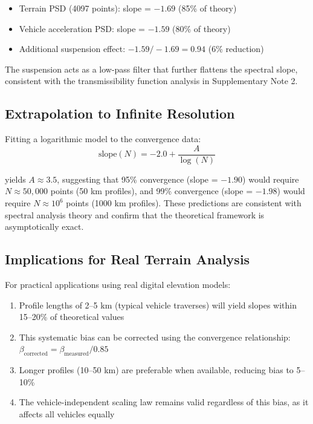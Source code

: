 \documentclass[11pt,letterpaper]{article}
\begin{document}
\begin{itemize}
\item Terrain PSD (4097 points): slope = $-1.69$ (85\% of theory)
\item Vehicle acceleration PSD: slope = $-1.59$ (80\% of theory)
\item Additional suspension effect: $-1.59 / -1.69 = 0.94$ (6\% reduction)
\end{itemize}

The suspension acts as a low-pass filter that further flattens the spectral slope, consistent with the transmissibility function analysis in Supplementary Note 2.

\subsection{Extrapolation to Infinite Resolution}

Fitting a logarithmic model to the convergence data:
\begin{equation}
\text{slope}(N) = -2.0 + \frac{A}{\log(N)}
\end{equation}

yields $A \approx 3.5$, suggesting that 95\% convergence (slope = $-1.90$) would require $N \approx 50{,}000$ points (50 km profiles), and 99\% convergence (slope = $-1.98$) would require $N \approx 10^6$ points (1000 km profiles). These predictions are consistent with spectral analysis theory and confirm that the theoretical framework is asymptotically exact.

\subsection{Implications for Real Terrain Analysis}

For practical applications using real digital elevation models:
\begin{enumerate}
\item Profile lengths of 2--5 km (typical vehicle traverses) will yield slopes within 15--20\% of theoretical values
\item This systematic bias can be corrected using the convergence relationship: $\beta_{\text{corrected}} = \beta_{\text{measured}} / 0.85$
\item Longer profiles (10--50 km) are preferable when available, reducing bias to 5--10\%
\item The vehicle-independent scaling law remains valid regardless of this bias, as it affects all vehicles equally
\end{enumerate}
\end{document}
